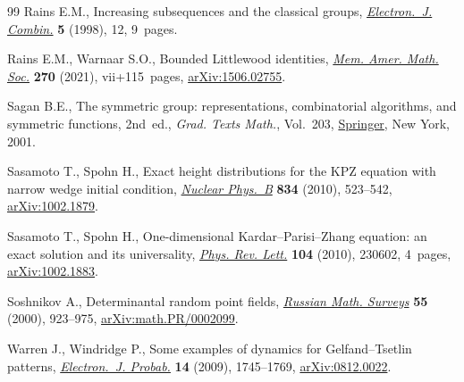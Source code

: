 \documentclass[pdftex]{sigma}
\numberwithin{equation}{section}
\begin{document}
\begin{thebibliography}{99}
Rains E.M., Increasing subsequences and the classical groups,
 \href{https://doi.org/10.37236/1350}{\textit{Electron.~J. Combin.}} \textbf{5} (1998), 12, 9~pages.

Rains E.M., Warnaar S.O., Bounded {L}ittlewood identities, \href{https://doi.org/10.1090/memo/1317}{\textit{Mem. Amer.
 Math. Soc.}} \textbf{270} (2021), vii+115~pages, \href{https://arxiv.org/abs/1506.02755}{arXiv:1506.02755}.

Sagan B.E., The symmetric group: representations, combinatorial algorithms, and
 symmetric functions, 2nd~ed., \textit{Grad. Texts Math.}, Vol.~203, \href{https://doi.org/10.1007/978-1-4757-6804-6}{Springer},
 New York, 2001.

Sasamoto T., Spohn H., Exact height distributions for the {KPZ} equation with
 narrow wedge initial condition, \href{https://doi.org/10.1016/j.nuclphysb.2010.03.026}{\textit{Nuclear Phys.~B}} \textbf{834} (2010),
 523--542, \href{https://arxiv.org/abs/1002.1879}{arXiv:1002.1879}.

Sasamoto T., Spohn H., One-dimensional {K}ardar--{P}arisi--{Z}hang equation: an
 exact solution and its universality, \href{https://doi.org/10.1103/PhysRevLett.104.230602}{\textit{Phys. Rev. Lett.}} \textbf{104}
 (2010), 230602, 4~pages, \href{https://arxiv.org/abs/1002.1883}{arXiv:1002.1883}.

Soshnikov A., Determinantal random point fields, \href{https://doi.org/10.1070/RM2000v055n05ABEH000321}{\textit{Russian Math. Surveys}}
 \textbf{55} (2000), 923--975, \href{https://arxiv.org/abs/math.PR/0002099}{arXiv:math.PR/0002099}.

Warren J., Windridge P., Some examples of dynamics for {G}elfand--{T}setlin
 patterns, \href{https://doi.org/10.1214/EJP.v14-682}{\textit{Electron.~J. Probab.}} \textbf{14} (2009), 1745--1769,
 \href{https://arxiv.org/abs/0812.0022}{arXiv:0812.0022}.

\end{thebibliography}\LastPageEnding
\end{document}
